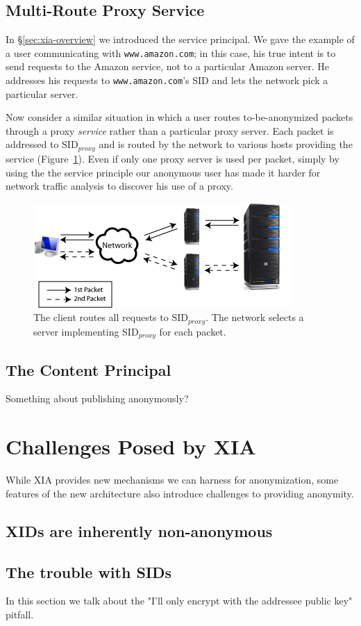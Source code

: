 \documentclass{article}
\begin{document}
\subsection{Multi-Route Proxy Service}
In \S\ref{sec:xia-overview} we introduced the service principal. We gave the example of a user communicating with \texttt{www.amazon.com}; in this case, his true intent is to send requests to the Amazon service, not to a particular Amazon server. He addresses his requests to \texttt{www.amazon.com}'s SID and lets the network pick a particular server.

Now consider a similar situation in which a user routes to-be-anonymized packets through a proxy \emph{service} rather than a particular proxy server. Each packet is addressed to SID$_{proxy}$ and is routed by the network to various hosts providing the service (Figure~\ref{fig:proxy-service}). Even if only one proxy server is used per packet, simply by using the the service principle our anonymous user has made it harder for network traffic analysis to discover his use of a proxy.
\begin{figure}
\includegraphics{images/proxy_service_multip_path.png}
\caption{The client routes all requests to SID$_{proxy}$. The network selects a server implementing SID$_{proxy}$ for each packet.}
\label{fig:proxy-service}
\end{figure}

\subsection{The Content Principal}
Something about publishing anonymously?

\section{Challenges Posed by XIA}
\label{sec:xia-challenges}
While XIA provides new mechanisms we can harness for anonymization, some features of the new architecture also introduce challenges to providing anonymity.
\subsection{XIDs are inherently non-anonymous}

\subsection{The trouble with SIDs}
In this section we talk about the "I'll only encrypt with the addressee public key" pitfall.
\end{document}

